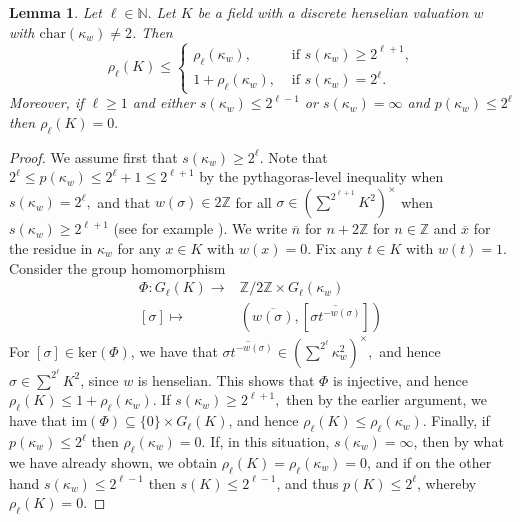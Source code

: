 \documentclass[a4paper,12pt,reqno]{amsart}
\newtheorem{lem}[thm]{Lemma}
\theoremstyle{definition}
\numberwithin{equation}{thm}
\renewcommand{\leq}{\leqslant}
\renewcommand{\geq}{\geqslant}
\begin{document}
\begin{lem}\label{bound-henselian}
 Let $\ell\in \mathbb{N}.$ Let $K$ be a field with a discrete henselian valuation $w$ with $\mathrm{char}(\kappa_w) \neq 2$. Then
$$\rho_\ell(K) \leq \left\{ \begin{array}{rl}\rho_\ell(\kappa_w), & \text{ if $s(\kappa_{w}) \geq 2^{\ell+1}$,} \\  1+ \rho_\ell(\kappa_w), & \text{ if } s(\kappa_w)=2^{\ell}. \end{array} \right.$$ Moreover, if $\ell\geq 1$ and either $s(\kappa_{w})\leq 2^{\ell-1}$ or $s(\kappa_w)= \infty$ and $p(\kappa_w)\leq 2^\ell$ then $\rho_{\ell}(K)=0.$ 
\end{lem}
\begin{proof} We assume first that $s(\kappa_{w})\geq 2^{\ell}.$ Note that $2^\ell \leq p(\kappa_{w})\leq 2^{\ell}+1\leq 2^{\ell+1}$ by the pythagoras-level inequality when $s(\kappa_{w})=2^{\ell},$ and that $w(\sigma)\in 2\mathbb{Z}$ for all $\sigma\in \left(\sum^{2^{\ell+1}} K^{2}\right)^\times$ when $s(\kappa_{w})\geq 2^{\ell+1}$ (see for example \cite[Lemma 4.1]{BGVG14}). We write $\overline{n}$ for $n+2\mathbb{Z}$ for $n \in \mathbb{Z}$ and $\overline{x}$ for the residue in $\kappa_w$ for any $x\in K$ with $w(x)=0$.
Fix any $t\in K$ with $w(t)=1$. Consider
 the group homomorphism
\begin{align*} \Phi:G_{\ell}(K) \to & \mathbb{Z}/2\mathbb{Z}\times G_{\ell}(\kappa_{w}) \\
[\sigma] \mapsto &  \left( \overline{w(\sigma)}, [\overline{\sigma t^{-w(\sigma)}}] \right)\end{align*} For $[\sigma] \in \mathrm{ker}(\Phi)$, we have that  $\overline{\sigma t^{-w(\sigma)}}\in \left(\sum^{2^{\ell}}\kappa_{w}^{2}\right)^\times,$ and hence $\sigma\in \sum^{2^{\ell}}K^{2}$, since $w$ is henselian. This shows that $\Phi$ is injective, and hence $\rho_{\ell}(K)\leq 1+\rho_{\ell}(\kappa_{w}).$ If $s(\kappa_{w})\geq 2^{\ell+1},$ then by the earlier argument, we have that $\mathrm{im}(\Phi) \subseteq \{0\} \times G_{\ell}(K)$, and hence $\rho_{\ell}(K)\leq \rho_{\ell}(\kappa_{w})$. Finally,  if $p(\kappa_{w})\leq 2^{\ell}$ then $\rho_{\ell}(\kappa_{w})=0$. If, in this situation, $s(\kappa_w)=\infty$, then by what we have already shown, we obtain $\rho_\ell(K)= \rho_\ell(\kappa_w)=0$, and if on the other hand $s(\kappa_w) \leq 2^{\ell-1}$ then $s(K)\leq 2^{\ell-1}$, and thus $p(K) \leq 2^\ell$, whereby $\rho_\ell(K)=0$.
\end{proof}
\end{document}
